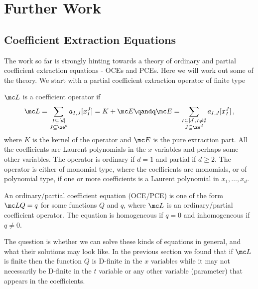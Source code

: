 
\chapter{Further Work}
\label{ch:Further}

\section{Coefficient Extraction Equations}

The work so far is strongly hinting towards a theory of ordinary and partial coefficient extraction equations - OCEs and PCEs. Here we will work out some of the theory. We start with a partial coefficient extraction operator of finite type
\begin{defn}$\mc L$ is a coefficient operator if
\begin{align}
	\mc L = \sum_{\substack{I\subseteq [d]\\ J \subseteq \ze^d}}a_{I,J}[x_I^J] = K + \mc E\qandq \mc E  = \sum_{\substack{I\subseteq [d],I\neq \emptyset\\ J \subseteq \ze^d}}a_{I,J}[x_I^J]\,,
\end{align}
where $K$ is the kernel of the operator and $\mc E$ is the pure extraction part. All the coefficients are Laurent polynomials in the $x$ variables and perhaps some other variables. The operator is ordinary if $d = 1$ and partial if $d \ge 2$. The operator is either of monomial type, where the coefficients are monomials, or of polynomial type, if one or more coefficients is a Laurent polynomial in $x_1,\ldots,x_d$.
\end{defn}
\begin{defn} An ordinary/partial coefficient equation (OCE/PCE) is one of the form $\mc L Q = q$ for some functions $Q$ and $q$, where $\mc L$ is an ordinary/partial coefficient operator. The equation is homogeneous if $q = 0$ and inhomogeneous if $q \neq 0$.
\end{defn}
The question is whether we can solve these kinds of equations in general, and what their solutions may look like. In the previous section we found that if $\mc L$ is finite then the function $Q$ is D-finite in the $x$ variables while it may not necessarily be D-finite in the $t$ variable or any other variable (parameter) that appears in the coefficients.


